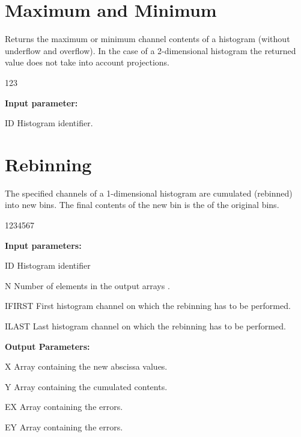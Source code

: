 \section{Maximum and Minimum}
\label{HMAXIMIN}
 
 
\Action
Returns the maximum or minimum channel contents of a histogram
(without underflow and overflow).
In the case of a 2-dimensional histogram the returned
value does not take into account projections.
 
\begin{DLtt}{123}
\item[{\rm\bf Input parameter:}]
\item[ID] Histogram identifier.
\end{DLtt}
 

\section{Rebinning}
\label{HREBINNI}
%


\Action
The specified channels of a 1-dimensional histogram are
cumulated (rebinned) into new bins.
The final contents of the new bin is the  
of the original bins.

\begin{DLtt}{1234567}
\item[{\rm\bf Input parameters:}]
\item[ID] Histogram identifier
\item[N] Number of elements in the output arrays .
\item[IFIRST] First histogram channel on which the rebinning has
to be performed.
\item[ILAST] Last histogram channel on which the rebinning has
to be performed.
\item[{\rm\bf Output Parameters:}]
\item[X]  Array containing the new abscissa values.
\item[Y]  Array containing the cumulated contents.
\item[EX] Array containing the  errors.
\item[EY] Array containing the  errors.
\end{DLtt}

